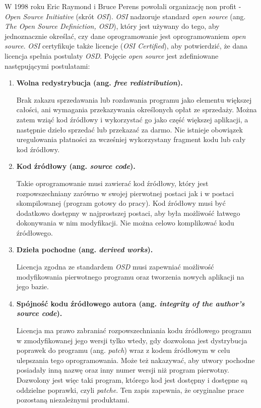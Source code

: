 \documentclass{article}
\begin{document}
W 1998 roku Eric Raymond i Bruce Perens powołali organizację non profit - \emph{Open Source Initiative} (skrót \emph{OSI})\cite{Kotula}. \emph{OSI} nadzoruje standard \emph{open source} (ang. \emph{The Open Source Definiction, OSD}), który jest używany do tego, aby jednoznacznie określać, czy dane oprogramowanie jest oprogramowaniem \emph{open source}. \emph{OSI} certyfikuje także licencje (\emph{OSI Certified}), aby potwierdzić, że dana
licencja spełnia postulaty \emph{OSD}\cite{opensource.org}. Pojęcie \emph{open source} jest zdefiniowane następującymi postulatami\cite{Kotula}:

\begin{enumerate}
    \item \textbf{Wolna redystrybucja (ang. \emph{free redistribution}).}
    
    \hspace{4mm} Brak zakazu sprzedawania lub rozdawania programu jako elementu większej całości, ani wymagania przekazywania określonych opłat ze sprzedaży. Można zatem wziąć kod źródłowy i wykorzystać go jako część większej aplikacji, a następnie dzieło sprzedać lub przekazać za darmo. Nie istnieje obowiązek uregulowania płatności za wcześniej wykorzystany fragment kodu lub cały kod źródłowy.
    
    \item \textbf{Kod źródłowy (ang. \emph{source code}).}
    
    \hspace{4mm} Takie oprogramowanie musi zawierać kod źródłowy, który jest rozpowszechniany zarówno w swojej pierwotnej postaci jak i w postaci skompilowanej (program gotowy do pracy). Kod źródłowy musi być dodatkowo dostępny w najprostszej postaci, aby była możliwość łatwego dokonywania w nim modyfikacji. Nie można celowo komplikować kodu źródłowego.
    
    \item \textbf{Dzieła pochodne (ang. \emph{derived works}).}
    
    \hspace{4mm} Licencja zgodna ze standardem \emph{OSD} musi zapewniać możliwość modyfikowania pierwotnego programu oraz tworzenia nowych aplikacji na jego bazie.
    
    \item \textbf{Spójność kodu źródłowego autora (ang. \emph{integrity of the author’s source code}).}
    
    \hspace{4mm} Licencja ma prawo zabraniać rozpowszechniania kodu źródłowego programu w zmodyfikowanej jego wersji tylko wtedy, gdy dozwolona jest dystrybucja poprawek do programu (ang. \emph{patch}) wraz z kodem źródłowym w celu ulepszania tego oprogramowania. Może też nakazywać, aby utwory pochodne posiadały inną nazwę oraz inny numer wersji niż program pierwotny. Dozwolony jest więc taki program, którego kod jest dostępny i dostępne są oddzielne poprawki, czyli \emph{patche}. Ten zapis zapewnia, że oryginalne prace pozostaną niezależnymi produktami.
    

\end{enumerate}
\end{document}
